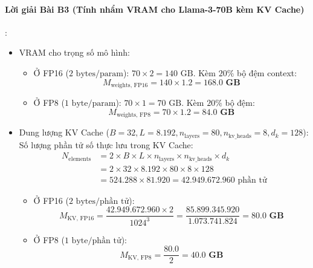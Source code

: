 \paragraph{Lời giải Bài B3 (Tính nhẩm VRAM cho Llama-3-70B kèm KV Cache)}:
\begin{itemize}
  \item[a)] VRAM cho trọng số mô hình:
  \begin{itemize}
    \item Ở FP16 ($2\text{ bytes/param}$): $70 \times 2 = 140\text{ GB}$. Kèm $20\%$ bộ đệm context:
    \begin{equation*}
    M_{\text{weights, FP16}} = 140 \times 1.2 = \mathbf{168.0\text{ GB}}
    \end{equation*}
    \item Ở FP8 ($1\text{ byte/param}$): $70 \times 1 = 70\text{ GB}$. Kèm $20\%$ bộ đệm:
    \begin{equation*}
    M_{\text{weights, FP8}} = 70 \times 1.2 = \mathbf{84.0\text{ GB}}
    \end{equation*}
  \end{itemize}

  \item[b)] Dung lượng KV Cache ($B = 32, L = 8.192, n_{\text{layers}} = 80, n_{\text{kv\_heads}} = 8, d_k = 128$):
  Số lượng phần tử số thực lưu trong KV Cache:
  \begin{align*}
  N_{\text{elements}} &= 2 \times B \times L \times n_{\text{layers}} \times n_{\text{kv\_heads}} \times d_k \\
  &= 2 \times 32 \times 8.192 \times 80 \times 8 \times 128 \\
  &= 524.288 \times 81.920 = 42.949.672.960 \text{ phần tử}
  \end{align*}
  \begin{itemize}
    \item Ở FP16 ($2\text{ bytes/phần tử}$):
    \begin{equation*}
    M_{\text{KV, FP16}} = \frac{42.949.672.960 \times 2}{1024^3} = \frac{85.899.345.920}{1.073.741.824} = \mathbf{80.0\text{ GB}}
    \end{equation*}
    \item Ở FP8 ($1\text{ byte/phần tử}$):
    \begin{equation*}
    M_{\text{KV, FP8}} = \frac{80.0}{2} = \mathbf{40.0\text{ GB}}
    \end{equation*}
  \end{itemize}


\end{itemize}
